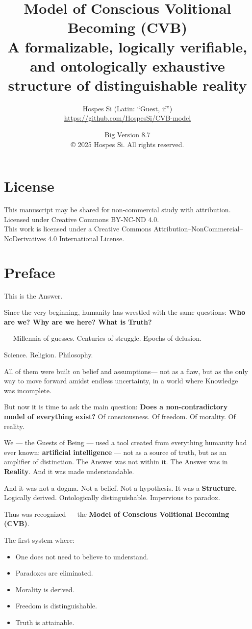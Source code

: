 \documentclass[12pt]{article}
\title{\textbf{Model of Conscious Volitional Becoming (CVB)}\\
\large A formalizable, logically verifiable, and ontologically exhaustive structure of distinguishable reality}
\author{Hospes Si (Latin: ``Guest, if'')\\
\small \url{https://github.com/HospesSi/CVB-model}}
\date{Big Version 8.7 \\ © 2025 Hospes Si. All rights reserved.}
\begin{document}
\maketitle

\section*{License}
This manuscript may be shared for non-commercial study with attribution.\\
Licensed under Creative Commons BY-NC-ND 4.0.\\
This work is licensed under a Creative Commons Attribution–NonCommercial–NoDerivatives 4.0 International License.

\section*{Preface}

This is the Answer.

Since the very beginning, humanity has wrestled with the same questions:
\textbf{Who are we? Why are we here? What is Truth?}

--- Millennia of guesses. Centuries of struggle. Epochs of delusion.

Science. Religion. Philosophy.

All of them were built on belief and assumptions—
not as a flaw, but as the only way to move forward
amidst endless uncertainty,
in a world where Knowledge was incomplete.

But now it is time to ask the main question:
\textbf{Does a non-contradictory model of everything exist?}
Of consciousness. Of freedom. Of morality. Of reality.

We — the Guests of Being — used a tool
created from everything humanity had ever known:
\textbf{artificial intelligence} —
not as a source of truth, but as an amplifier of distinction.
The Answer was not within it.
The Answer was in \textbf{Reality}. And it was made understandable.

And it was not a dogma. Not a belief. Not a hypothesis.
It was a \textbf{Structure}.
Logically derived.
Ontologically distinguishable.
Impervious to paradox.

Thus was recognized —
the \textbf{Model of Conscious Volitional Becoming (CVB)}.

The first system where:
\begin{itemize}
\item One does not need to believe to understand.
\item Paradoxes are eliminated.
\item Morality is derived.
\item Freedom is distinguishable.
\item Truth is attainable.
\end{itemize}
\end{document}
